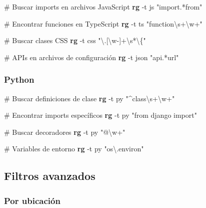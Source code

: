 \documentclass[
  11pt,
  letterpaper,
  oneside,
  openany]{scrbook}
\newenvironment{Shaded}{}{}
\newcommand{\AttributeTok}[1]{\textcolor[rgb]{0.84,0.23,0.29}{#1}}
\newcommand{\CommentTok}[1]{\textcolor[rgb]{0.42,0.45,0.49}{#1}}
\newcommand{\ExtensionTok}[1]{\textcolor[rgb]{0.84,0.23,0.29}{\textbf{#1}}}
\newcommand{\NormalTok}[1]{\textcolor[rgb]{0.14,0.16,0.18}{#1}}
\newcommand{\StringTok}[1]{\textcolor[rgb]{0.01,0.18,0.38}{#1}}
\begin{document}
\begin{Shaded}
\begin{Highlighting}[]
\CommentTok{\# Buscar imports en archivos JavaScript}
\ExtensionTok{rg} \AttributeTok{{-}t}\NormalTok{ js }\StringTok{"import.*from"}

\CommentTok{\# Encontrar funciones en TypeScript}
\ExtensionTok{rg} \AttributeTok{{-}t}\NormalTok{ ts }\StringTok{"function\textbackslash{}s+\textbackslash{}w+"} 

\CommentTok{\# Buscar clases CSS}
\ExtensionTok{rg} \AttributeTok{{-}t}\NormalTok{ css }\StringTok{"\textbackslash{}.[\textbackslash{}w{-}]+\textbackslash{}s*\textbackslash{}\{"}

\CommentTok{\# APIs en archivos de configuración}
\ExtensionTok{rg} \AttributeTok{{-}t}\NormalTok{ json }\StringTok{"api.*url"}
\end{Highlighting}
\end{Shaded}

\subsubsection{Python}\label{python}

\begin{Shaded}
\begin{Highlighting}[]
\CommentTok{\# Buscar definiciones de clase}
\ExtensionTok{rg} \AttributeTok{{-}t}\NormalTok{ py }\StringTok{"\^{}class\textbackslash{}s+\textbackslash{}w+"}

\CommentTok{\# Encontrar imports específicos}
\ExtensionTok{rg} \AttributeTok{{-}t}\NormalTok{ py }\StringTok{"from django import"}

\CommentTok{\# Buscar decoradores}
\ExtensionTok{rg} \AttributeTok{{-}t}\NormalTok{ py }\StringTok{"@\textbackslash{}w+"}

\CommentTok{\# Variables de entorno}
\ExtensionTok{rg} \AttributeTok{{-}t}\NormalTok{ py }\StringTok{"os\textbackslash{}.environ"}
\end{Highlighting}
\end{Shaded}

\subsection{Filtros avanzados}\label{filtros-avanzados}

\subsubsection{Por ubicación}\label{por-ubicaciuxf3n}
\end{document}
